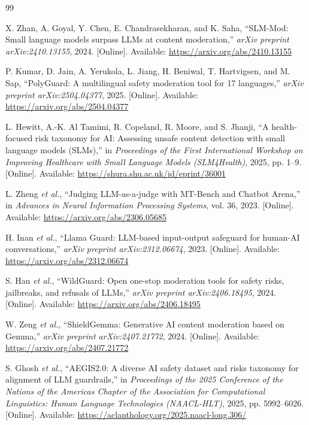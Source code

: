 \documentclass[11pt,a4paper]{article}
\begin{document}
\begin{thebibliography}{99}

X. Zhan, A. Goyal, Y. Chen, E. Chandrasekharan, and K. Saha,
``SLM-Mod: Small language models surpass LLMs at content moderation,''
\emph{arXiv preprint arXiv:2410.13155}, 2024.
[Online]. Available: \url{https://arxiv.org/abs/2410.13155}

P. Kumar, D. Jain, A. Yerukola, L. Jiang, H. Beniwal, T. Hartvigsen,
and M. Sap,
``PolyGuard: A multilingual safety moderation tool for 17 languages,''
\emph{arXiv preprint arXiv:2504.04377}, 2025.
[Online]. Available: \url{https://arxiv.org/abs/2504.04377}

L. Hewitt, A.-K. Al Tamimi, R. Copeland, R. Moore, and S. Jhanji,
``A health-focused risk taxonomy for AI: Assessing unsafe content
detection with small language models (SLMs),''
in \emph{Proceedings of the First International Workshop on Improving
Healthcare with Small Language Models (SLM4Health)}, 2025, pp. 1--9.
[Online]. Available: \url{https://shura.shu.ac.uk/id/eprint/36001}

L. Zheng \emph{et al.},
``Judging LLM-as-a-judge with MT-Bench and Chatbot Arena,''
in \emph{Advances in Neural Information Processing Systems},
vol. 36, 2023.
[Online]. Available: \url{https://arxiv.org/abs/2306.05685}

H. Inan \emph{et al.},
``Llama Guard: LLM-based input-output safeguard for human-AI
conversations,''
\emph{arXiv preprint arXiv:2312.06674}, 2023.
[Online]. Available: \url{https://arxiv.org/abs/2312.06674}

S. Han \emph{et al.},
``WildGuard: Open one-stop moderation tools for safety risks,
jailbreaks, and refusals of LLMs,''
\emph{arXiv preprint arXiv:2406.18495}, 2024.
[Online]. Available: \url{https://arxiv.org/abs/2406.18495}

W. Zeng \emph{et al.},
``ShieldGemma: Generative AI content moderation based on Gemma,''
\emph{arXiv preprint arXiv:2407.21772}, 2024.
[Online]. Available: \url{https://arxiv.org/abs/2407.21772}

S. Ghosh \emph{et al.},
``AEGIS2.0: A diverse AI safety dataset and risks taxonomy for
alignment of LLM guardrails,''
in \emph{Proceedings of the 2025 Conference of the Nations of the
Americas Chapter of the Association for Computational Linguistics:
Human Language Technologies (NAACL-HLT)}, 2025, pp. 5992--6026.
[Online]. Available:
\url{https://aclanthology.org/2025.naacl-long.306/}


\end{thebibliography}
\end{document}

